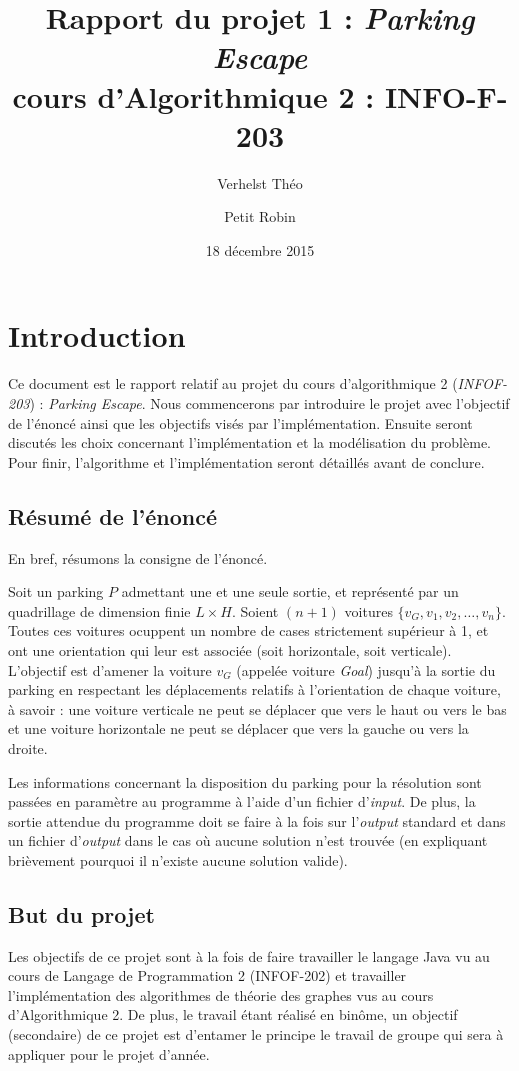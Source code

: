 \documentclass{article}
\title{Rapport du projet 1 : \textit{Parking Escape}\\cours d'Algorithmique 2 : INFO-F-203}
\author{Verhelst Théo \and Petit Robin}
\date{18 décembre 2015}
\begin{document}
\maketitle
\tableofcontents
\newpage
{}

\section{Introduction}
    Ce document est le rapport relatif au projet du cours d'algorithmique 2 (\textit{INFOF-203}) : \textit{Parking Escape}. Nous commencerons par
    introduire le projet avec l'objectif de l'énoncé ainsi que les objectifs visés par l'implémentation. Ensuite seront discutés les choix concernant
    l'implémentation et la modélisation du problème. Pour finir, l'algorithme et l'implémentation seront détaillés avant de conclure.

    \subsection{Résumé de l'énoncé}
        En bref, résumons la consigne de l'énoncé.

        Soit un parking $P$ admettant une et une seule sortie, et représenté par un quadrillage de dimension finie $L\times H$. Soient $(n+1)$ voitures $\{v_G, v_1, v_2, \ldots, v_n\}$. Toutes ces voitures ocuppent un nombre de cases strictement supérieur à 1, et ont une
        orientation qui leur est associée (soit horizontale, soit verticale). L'objectif est d'amener la voiture $v_G$ (appelée voiture \textit{Goal})
        jusqu'à la sortie du parking en respectant les déplacements relatifs à l'orientation de chaque voiture, à savoir : une voiture verticale ne peut
        se déplacer que vers le haut ou vers le bas et une voiture horizontale ne peut se déplacer que vers la gauche ou vers la droite.

        Les informations concernant la disposition du parking pour la résolution sont passées en paramètre au programme à l'aide d'un fichier d'\textit{input}.
        De plus, la sortie attendue du programme doit se faire à la fois sur l'\textit{output} standard et dans un fichier d'\textit{output} dans le cas où
        aucune solution n'est trouvée (en expliquant brièvement pourquoi il n'existe aucune solution valide).

    \subsection{But du projet}
        Les objectifs de ce projet sont à la fois de faire travailler le langage Java vu au cours de Langage de Programmation 2 (INFOF-202) et
        travailler l'implémentation des algorithmes de théorie des graphes vus au cours d'Algorithmique 2. De plus, le travail étant réalisé en binôme,
        un objectif (secondaire) de ce projet est d'entamer le principe le travail de groupe qui sera à appliquer pour le projet d'année.
\end{document}
